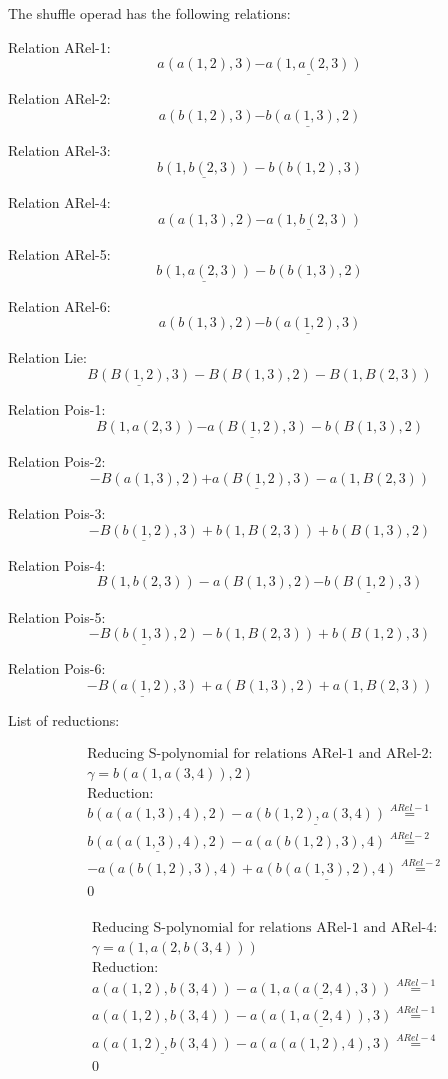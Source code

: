 \documentclass[11pt]{amsart}
\begin{document}
 
 
The shuffle operad has the following relations: 

 Relation ARel-1: 
 $$ 
a(a(1,2),3)\underline{ - a(1,a(2,3))}
 $$ 

 Relation ARel-2: 
 $$ 
a(b(1,2),3)\underline{ - b(a(1,3),2)}
 $$ 

 Relation ARel-3: 
 $$ 
\underline{b(1,b(2,3))} - b(b(1,2),3)
 $$ 

 Relation ARel-4: 
 $$ 
a(a(1,3),2)\underline{ - a(1,b(2,3))}
 $$ 

 Relation ARel-5: 
 $$ 
\underline{b(1,a(2,3))} - b(b(1,3),2)
 $$ 

 Relation ARel-6: 
 $$ 
a(b(1,3),2)\underline{ - b(a(1,2),3)}
 $$ 

 Relation Lie: 
 $$ 
\underline{B(B(1,2),3)} - B(B(1,3),2) - B(1,B(2,3))
 $$ 

 Relation Pois-1: 
 $$ 
B(1,a(2,3))\underline{ - a(B(1,2),3)} - b(B(1,3),2)
 $$ 

 Relation Pois-2: 
 $$ 
 - B(a(1,3),2)\underline{ + a(B(1,2),3)} - a(1,B(2,3))
 $$ 

 Relation Pois-3: 
 $$ 
\underline{ - B(b(1,2),3)} + b(1,B(2,3)) + b(B(1,3),2)
 $$ 

 Relation Pois-4: 
 $$ 
B(1,b(2,3)) - a(B(1,3),2)\underline{ - b(B(1,2),3)}
 $$ 

 Relation Pois-5: 
 $$ 
\underline{ - B(b(1,3),2)} - b(1,B(2,3)) + b(B(1,2),3)
 $$ 

 Relation Pois-6: 
 $$ 
\underline{ - B(a(1,2),3)} + a(B(1,3),2) + a(1,B(2,3))
 $$ 

 
 
 List of reductions: 
 
\begin{align*} 
& \text{Reducing S-polynomial for relations ARel-1 and ARel-2:} \\ 
& \gamma = b(a(1,a(3,4)),2) \\ 
& \text{Reduction}: \\&b(a(a(1,3),4),2) - \underline{a(b(1,2),a(3,4))} \stackrel{ ARel-1 }{=}  \\ 
&\underline{b(a(a(1,3),4),2)} - a(a(b(1,2),3),4) \stackrel{ ARel-2 }{=}  \\ 
& - a(a(b(1,2),3),4) + \underline{a(b(a(1,3),2),4)} \stackrel{ ARel-2 }{=}  \\ 
&0\\ 
\end{align*} 
 
\begin{align*} 
& \text{Reducing S-polynomial for relations ARel-1 and ARel-4:} \\ 
& \gamma = a(1,a(2,b(3,4))) \\ 
& \text{Reduction}: \\&a(a(1,2),b(3,4)) - \underline{a(1,a(a(2,4),3))} \stackrel{ ARel-1 }{=}  \\ 
&a(a(1,2),b(3,4)) - \underline{a(a(1,a(2,4)),3)} \stackrel{ ARel-1 }{=}  \\ 
&\underline{a(a(1,2),b(3,4))} - a(a(a(1,2),4),3) \stackrel{ ARel-4 }{=}  \\ 
&0\\ 
\end{align*} 
 
\end{document}
